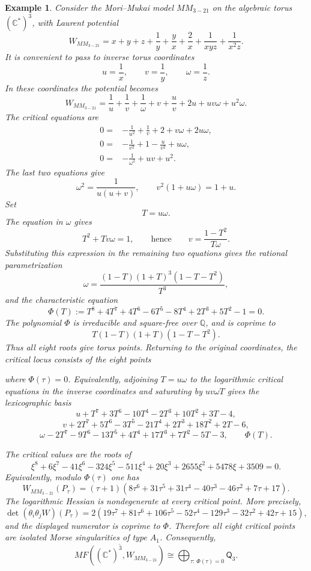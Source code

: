 \documentclass[11pt]{amsart}
\newtheorem{example}{Example}[section]
\newcommand{\MorseCat}[1]{\mathsf{Q}_{#1}}
\newcommand{\fitdisplay}[1]{%
  \begin{center}%
  \resizebox{\textwidth}{!}{$\displaystyle #1$}%
  \end{center}%
}
\begin{document}
\begin{example}
Consider the Mori--Mukai model $MM_{3-21}$ on the algebraic torus
$(\mathbb{C}^*)^3$, with Laurent potential
\[
W_{MM_{3-21}}=x+y+z+\frac{1}{y}+\frac{y}{x}+\frac{2}{x}
+\frac{1}{xyz}+\frac{1}{x^2z}.
\]
It is convenient to pass to inverse torus coordinates
\[
u=\frac{1}{x},
\qquad
v=\frac{1}{y},
\qquad
\omega=\frac{1}{z}.
\]
In these coordinates the potential becomes
\[
W_{MM_{3-21}}=\frac{1}{u}+\frac{1}{v}+\frac{1}{\omega}
+v+\frac{u}{v}+2u+uv\omega+u^2\omega.
\]
The critical equations are
\begin{align*}
0={}&-\frac{1}{u^2}+\frac{1}{v}+2+v\omega+2u\omega, \\
0={}&-\frac{1}{v^2}+1-\frac{u}{v^2}+u\omega, \\
0={}&-\frac{1}{\omega^2}+uv+u^2.
\end{align*}
The last two equations give
\[
\omega^2=\frac{1}{u(u+v)},
\qquad
v^2(1+u\omega)=1+u.
\]
Set
\[
T=u\omega.
\]
The equation in $\omega$ gives
\[
T^2+Tv\omega=1,
\qquad\text{hence}\qquad
v=\frac{1-T^2}{T\omega}.
\]
Substituting this expression in the remaining two equations gives the rational
parametrization
\[
\omega=\frac{(1-T)(1+T)^3(1-T-T^2)}{T^3},
\]
and the characteristic equation
\[
\Phi(T):=T^8+4T^7+4T^6-6T^5-8T^4+2T^3+5T^2-1=0.
\]
The polynomial $\Phi$ is irreducible and square-free over $\mathbb{Q}$, and is
coprime to
\[
T(1-T)(1+T)(1-T-T^2).
\]
Thus all eight roots give torus points. Returning to the original coordinates,
the critical locus consists of the eight points
\fitdisplay{P_\tau=\left(
\frac{(1-\tau)(1+\tau)^3(1-\tau-\tau^2)}{\tau^4},
\frac{(1+\tau)^2(1-\tau-\tau^2)}{\tau^2},
\frac{\tau^3}{(1-\tau)(1+\tau)^3(1-\tau-\tau^2)}
\right)}
where $\Phi(\tau)=0$. Equivalently, adjoining $T=u\omega$ to the logarithmic
critical equations in the inverse coordinates and saturating by $uv\omega T$
gives the lexicographic basis
\[
u+T^7+3T^6-10T^4-2T^3+10T^2+3T-4,
\]
\[
v+2T^7+5T^6-3T^5-21T^4+2T^3+18T^2+2T-6,
\]
\[
\omega-2T^7-9T^6-13T^5+4T^4+17T^3+7T^2-5T-3,
\qquad
\Phi(T).
\]

The critical values are the roots of
\[
\xi^8+6\xi^7-41\xi^6-324\xi^5-511\xi^4+20\xi^3
+2655\xi^2+5478\xi+3509=0.
\]
Equivalently, modulo $\Phi(\tau)$ one has
\[
W_{MM_{3-21}}(P_\tau)=
(\tau+1)(8\tau^6+31\tau^5+31\tau^4-40\tau^3
-46\tau^2+7\tau+17).
\]
The logarithmic Hessian is nondegenerate at every critical point. More
precisely,
\[
\det(\theta_i\theta_jW)(P_\tau)
=2(19\tau^7+81\tau^6+106\tau^5-52\tau^4-129\tau^3
-32\tau^2+42\tau+15),
\]
and the displayed numerator is coprime to $\Phi$. Therefore all eight critical
points are isolated Morse singularities of type $A_1$. Consequently,
\[
\overline{MF((\mathbb{C}^*)^3,W_{MM_{3-21}})}
\cong \bigoplus_{\tau:\,\Phi(\tau)=0}\MorseCat{3}.
\]
\end{example}
\end{document}
